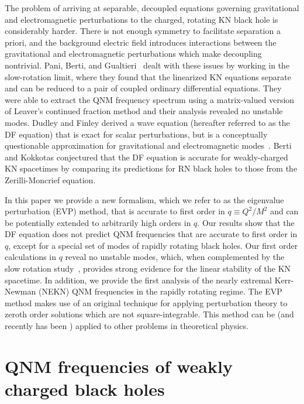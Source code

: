 \begin{refsection}
The problem of arriving at separable, decoupled equations governing gravitational and electromagnetic perturbations to the charged, rotating KN black hole is considerably harder. There is not enough symmetry to facilitate separation a priori, and the background electric field introduces interactions between the gravitational and electromagnetic perturbations which make decoupling nontrivial. 
Pani, Berti, and Gualtieri~\cite{Pani2013PRl,Pani2013PHYSD} dealt with these issues by working in the slow-rotation limit, where they found that the linearized KN equations separate and can be reduced to a pair of coupled ordinary differential equations. 
They were able to extract the QNM frequency spectrum using a matrix-valued version of Leaver's continued fraction method and their analysis revealed no unstable modes. 
Dudley and Finley derived a wave equation (hereafter referred to as the DF equation) that is exact for scalar perturbations, but is a conceptually questionable approximation for gravitational and electromagnetic modes~\cite{Dudley:1977zz,Dudley1979}.
Berti and Kokkotas \cite{BertiKokkotas2005} conjectured that the DF equation is accurate for weakly-charged KN spacetimes by comparing its predictions for RN black holes to those from the Zerilli-Moncrief equation. 

In this paper we provide a new formalism, which we refer to as the eigenvalue perturbation (EVP) method, that is accurate to first order in $q\equiv Q^2/M^2$ and can be potentially extended to arbitrarily high orders in $q$. Our results show that the DF equation does not predict QNM frequencies that are accurate to first order in $q$, except for a special set of modes of rapidly rotating black holes. Our first order calculations in $q$ reveal no unstable modes, which, when complemented by the slow rotation study~\cite{Pani2013PRl,Pani2013PHYSD}, provides strong evidence for the linear stability of the KN spacetime. In addition, we provide the first analysis of the nearly extremal Kerr-Newman (NEKN) QNM frequencies in the rapidly rotating regime. The EVP method makes use of an original technique for applying perturbation theory to zeroth order solutions which are not square-integrable. This method can be (and recently has been \cite{Zimmerman:2014aha,Yang:2014zva,Yang:2014tla}) applied to other problems in theoretical physics.

\section{QNM frequencies of weakly charged black holes}


\end{refsection}
